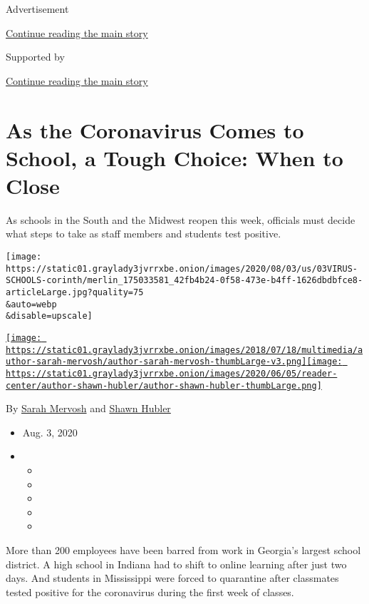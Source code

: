 Advertisement

\protect\hyperlink{after-top}{Continue reading the main story}

Supported by

\protect\hyperlink{after-sponsor}{Continue reading the main story}

\hypertarget{as-the-coronavirus-comes-to-school-a-tough-choice-when-to-close}{%
\section{As the Coronavirus Comes to School, a Tough Choice: When to
Close}\label{as-the-coronavirus-comes-to-school-a-tough-choice-when-to-close}}

As schools in the South and the Midwest reopen this week, officials must
decide what steps to take as staff members and students test positive.

\texttt{[image: https://static01.graylady3jvrrxbe.onion/images/2020/08/03/us/03VIRUS-SCHOOLS-corinth/merlin\_175033581\_42fb4b24-0f58-473e-b4ff-1626dbdbfce8-articleLarge.jpg?quality=75\\\&auto=webp\\\&disable=upscale]}

\href{https://www.nytimes3xbfgragh.onion/by/sarah-mervosh}{\texttt{[image: https://static01.graylady3jvrrxbe.onion/images/2018/07/18/multimedia/author-sarah-mervosh/author-sarah-mervosh-thumbLarge-v3.png]}}\href{https://www.nytimes3xbfgragh.onion/by/shawn-hubler}{\texttt{[image: https://static01.graylady3jvrrxbe.onion/images/2020/06/05/reader-center/author-shawn-hubler/author-shawn-hubler-thumbLarge.png]}}

By \href{https://www.nytimes3xbfgragh.onion/by/sarah-mervosh}{Sarah
Mervosh} and
\href{https://www.nytimes3xbfgragh.onion/by/shawn-hubler}{Shawn Hubler}

\begin{itemize}
\item
  Aug. 3, 2020
\item
  \begin{itemize}
  \item
  \item
  \item
  \item
  \item
  \end{itemize}
\end{itemize}

More than 200 employees have been barred from work in Georgia's largest
school district. A high school in Indiana had to shift to online
learning after just two days. And students in Mississippi were forced to
quarantine after classmates tested positive for the coronavirus during
the first week of classes.

